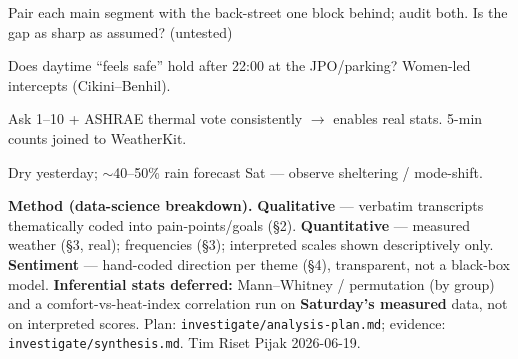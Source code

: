 \begin{tcbraster}[raster columns=4, raster equal height=rows, colback=accent!5, colframe=accent!40,
  fonttitle=\bfseries\footnotesize, coltitle=accent!70!black, size=small, arc=2pt]
  \begin{tcolorbox}[title=The gradient]\scriptsize Pair each main segment with the back-street one block behind; audit both. Is the gap as sharp as assumed? (untested)\end{tcolorbox}
  \begin{tcolorbox}[title=Night \& women]\scriptsize Does daytime ``feels safe'' hold after 22:00 at the JPO/parking? Women-led intercepts (Cikini--Benhil).\end{tcolorbox}
  \begin{tcolorbox}[title=Measured scales]\scriptsize Ask 1--10 + ASHRAE thermal vote consistently $\to$ enables real stats. 5-min counts joined to WeatherKit.\end{tcolorbox}
  \begin{tcolorbox}[title=Rain behaviour]\scriptsize Dry yesterday; $\sim$40--50\% rain forecast Sat --- observe sheltering / mode-shift.\end{tcolorbox}
\end{tcbraster}

\vspace{3pt}
\begin{tcolorbox}[colback=ink!3,colframe=soft,arc=2pt,boxsep=2pt,left=6pt,right=6pt,top=4pt,bottom=4pt]
\scriptsize\textbf{Method (data-science breakdown).}
\textbf{Qualitative} --- verbatim transcripts thematically coded into pain-points/goals (\S2).
\textbf{Quantitative} --- measured weather (\S3, real); frequencies (\S3); interpreted scales shown descriptively only.
\textbf{Sentiment} --- hand-coded direction per theme (\S4), transparent, not a black-box model.
\textbf{Inferential stats deferred:} Mann--Whitney / permutation (by group) and a comfort-vs-heat-index
correlation run on \textbf{Saturday's measured} data, not on interpreted scores. Plan: \texttt{investigate/analysis-plan.md};
evidence: \texttt{investigate/synthesis.md}. \hfill Tim Riset Pijak \textbullet{} 2026-06-19.
\end{tcolorbox}
